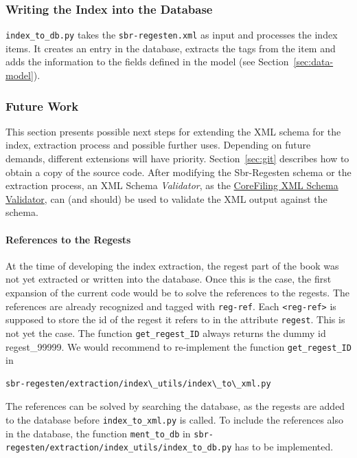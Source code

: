 \subsubsection{Writing the Index into the Database}
\texttt{index\_to\_db.py} takes the \texttt{sbr-regesten.xml} as input
and processes the index items. It creates an entry in the database,
extracts the tags from the item and adds the information to the fields
defined in the model (see Section~\ref{sec:data-model}).

\subsubsection{Future Work}
This section presents possible next steps for extending the XML schema
for the index, extraction process and possible further uses. Depending
on future demands, different extensions will have priority.
Section~\ref{sec:git} describes how to obtain a copy of the source
code. After modifying the Sbr-Regesten schema or the extraction
process, an XML Schema \emph{Validator}, as the
\href{http://corefiling.com/opensource/schemaValidate.html}
{CoreFiling XML Schema Validator}, can (and should) be used to
validate the XML output against the schema.

\paragraph{References to the Regests}
At the time of developing the index extraction, the regest part of the
book was not yet extracted or written into the database. Once this is
the case, the first expansion of the current code would be to solve
the references to the regests. The references are already recognized
and tagged with \texttt{reg-ref}. Each \texttt{<reg-ref>} is supposed
to store the id of the regest it refers to in the attribute
\texttt{regest}. This is not yet the case. The function
\texttt{get\_regest\_ID} always returns the dummy id regest\_99999. We
would recommend to re-implement the function \texttt{get\_regest\_ID}
in

\begin{verbatim}
sbr-regesten/extraction/index\_utils/index\_to\_xml.py
\end{verbatim}

The references can be solved by searching the database, as the regests
are added to the database before \texttt{index\_to\_xml.py} is called.
To include the references also in the database, the function
\texttt{ment\_to\_db} in
\texttt{sbr-regesten/extraction/index\_utils/index\_to\_db.py} has to
be implemented.

